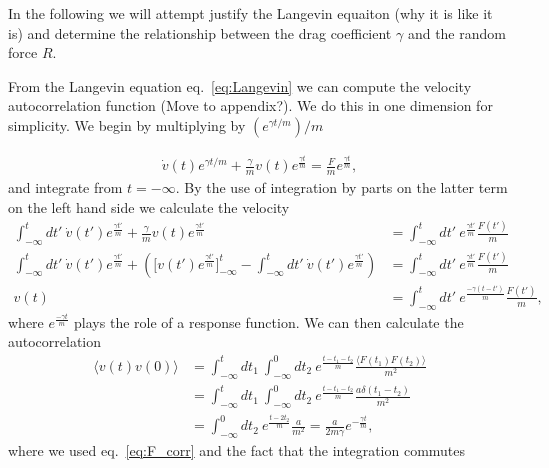 
In the following we will attempt justify the Langevin equaiton (why it is like
it is) and determine the relationship between the drag coefficient $\gamma$ and
the random force $R$.


From the Langevin equation eq.~\eqref{eq:Langevin} we can compute the velocity
autocorrelation function (Move to appendix?). We do this in one dimension for
simplicity. We begin by multiplying by $(e^{\gamma t /m})/m$

\begin{align*}
  \dot{ v}(t)e^{\gamma t /m} + \frac{\gamma}{m} v(t)e^{\frac{\gamma t}{m}}  = \frac{ F}{m}e^{\frac{\gamma t}{m}},
\end{align*}
and integrate from $t = -\infty$. By the use of integration by parts on the
latter term on the left hand side we calculate the velocity 
\begin{align*}
  \int_{-\infty}^t dt' \ \dot{ v}(t')e^{\frac{\gamma t'}{m}} + \frac{\gamma}{m} v(t)e^{\frac{\gamma t'}{m}} &=  \int_{-\infty}^t dt' \ e^{\frac{\gamma t'}{m}} \frac{ F(t')}{m}  \\
  \int_{-\infty}^t dt' \ \dot{ v}(t')e^{\frac{\gamma t'}{m}} + \left(\Big[ v(t')e^{\frac{\gamma t'}{m}}\Big]_{-\infty}^t - \int_{-\infty}^t dt' \ \dot{ v}(t')e^{\frac{\gamma t'}{m}}\right) &= \int_{-\infty}^t dt' \ e^{\frac{\gamma t'}{m}} \frac{ F(t')}{m}  \\
   v(t) &= \int_{-\infty}^t dt' \ e^{\frac{-\gamma(t - t')}{m}} \frac{ F(t')}{m},
\end{align*}
where $e^{\frac{-\gamma t}{m}}$ plays the role of a response function. We can
then calculate the autocorrelation 
\begin{align*}
  \big\langle  v(t) v(0) \big\rangle &= \int_{-\infty}^t dt_1 \ \int_{-\infty}^0 dt_2 \ e^{\frac{t - t_1 - t_2}{m}} \frac{\langle  F(t_1)  F(t_2) \rangle}{m^2} \\
  &= \int_{-\infty}^t dt_1 \ \int_{-\infty}^0 dt_2 \ e^{\frac{t - t_1 - t_2}{m}} \frac{a \delta(t_1 - t_2)}{m^2} \\
  &= \int_{-\infty}^0 dt_2 \ e^{\frac{t - 2t_2}{m}} \frac{a}{m^2} = \frac{a}{2m\gamma}e^{-\frac{\gamma t}{m}},
\end{align*}
where we used eq.~\eqref{eq:F_corr} and the fact that the integration commutes
